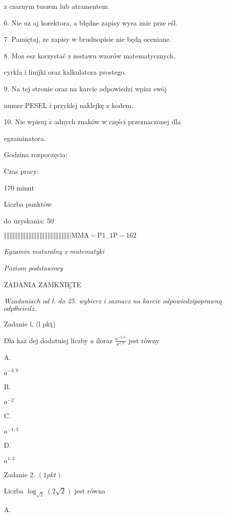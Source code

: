\documentclass[a4paper,12pt]{article}
\begin{document}
z czarnym tuszem lub atramentem.

6. Nie $\mathrm{u}\dot{\mathrm{z}}$ aj korektora, a błędne zapisy wyra $\acute{\mathrm{z}}\mathrm{n}\mathrm{i}\mathrm{e}$ prze eśl.

7. Pamiętaj, $\dot{\mathrm{z}}\mathrm{e}$ zapisy w brudnopisie nie będą oceniane.

8. $\mathrm{M}\mathrm{o}\dot{\mathrm{z}}$ esz korzystać z zestawu wzorów matematycznych,

cyrkla i linijki oraz kalkulatora prostego.

9. Na tej stronie oraz na karcie odpowiedzi wpisz swój

numer PESEL i przyklej naklejkę z kodem.

10. Nie wpisuj $\dot{\mathrm{z}}$ adnych znaków w części przeznaczonej dla

egzaminatora.

Godzina rozpoczęcia:

Czas pracy:

170 minut

Liczba punktów

do uzyskania: 50

$\Vert\Vert\Vert\Vert\Vert\Vert\Vert\Vert\Vert\Vert\Vert\Vert\Vert\Vert\Vert\Vert\Vert\Vert\Vert\Vert\Vert\Vert\Vert\Vert|  \mathrm{M}\mathrm{M}\mathrm{A}-\mathrm{P}1_{-}1\mathrm{P}-162$




{\it Egzamin maturalny z matematyki}

{\it Poziom podstawowy}

ZADANIA ZAMKNIĘTE

{\it Wzadaniach od l. do 25. wybierz i zaznacz na karcie odpowiedzipoprawnq} $odp\theta wied\acute{z}.$

Zadanie l, (l pkţ)

Dla $\mathrm{k}\mathrm{a}\dot{\mathrm{z}}$ dej dodatniej liczby $a$ iloraz $\displaystyle \frac{a^{-2,6}}{a^{1,3}}$ jest równy

A.

$a^{-3,9}$

B.

$a^{-2}$

C.

$a^{-1,3}$

D.

$a^{1,3}$

Zadanie 2. $(1pkt)$

Liczba $\log_{\sqrt{2}}(2\sqrt{2})$ jest równa

A.
\end{document}
